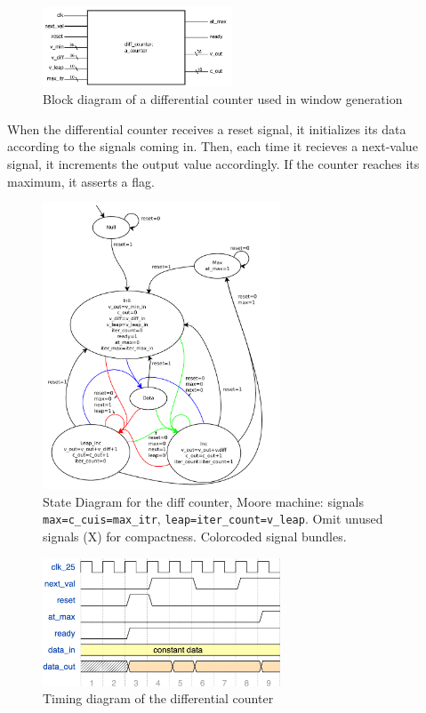 \documentclass{article}
\begin{document}
\begin{figure}[h!]
  \centering
    \includegraphics[width=160pt]{block_diagrams/acounter.pdf}
  \caption{Block diagram of a differential counter used in window generation}
\end{figure}

When the differential counter receives a reset signal, it initializes its data according to the signals coming in.
Then, each time it recieves a next-value signal, it increments the output value accordingly. If the counter reaches
its maximum, it asserts a flag.

\begin{figure}[H]
  \centering
    \includegraphics[width=200pt]{state_diagrams/diff_counter.pdf}
  \caption{State Diagram for the diff counter, Moore machine: signals
    \texttt{max=c\_cuis=max\_itr}, \texttt{leap=iter\_count=v\_leap}. Omit
    unused signals (X) for compactness. Colorcoded signal bundles.}
\end{figure}

\begin{figure}[H]
  \centering
    \includegraphics[width=200pt]{timing_diagrams/diff_counter.pdf}
  \caption{Timing diagram of the differential counter}
\end{figure}
\end{document}
